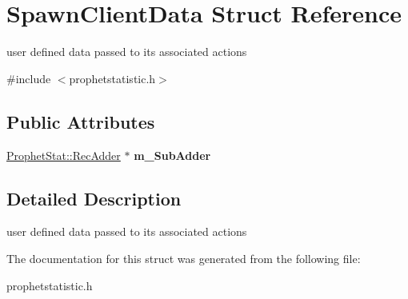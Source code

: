 \hypertarget{structSpawnClientData}{
\section{SpawnClientData Struct Reference}
\label{structSpawnClientData}
}


user defined data passed to its associated actions  




{\ttfamily \#include $<$prophetstatistic.h$>$}

\subsection*{Public Attributes}
\begin{DoxyCompactItemize}
\item 
\hypertarget{structSpawnClientData_a8e35651fe3951d5a6a34ef3dca2e09c6}{
\hyperlink{classProphetStat_1_1RecAdder}{ProphetStat::RecAdder} $\ast$ {\bfseries m\_\-SubAdder}}
\label{structSpawnClientData_a8e35651fe3951d5a6a34ef3dca2e09c6}

\end{DoxyCompactItemize}


\subsection{Detailed Description}
user defined data passed to its associated actions 

The documentation for this struct was generated from the following file:\begin{DoxyCompactItemize}
\item 
prophetstatistic.h\end{DoxyCompactItemize}
